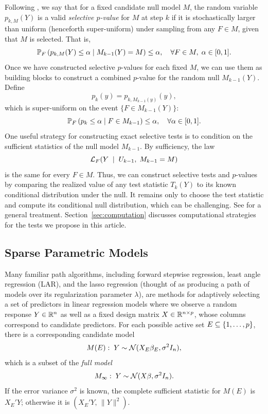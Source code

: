 \documentclass{article}
\begin{document}
Following \citet{fithian2014optimal}, we say that for a fixed candidate null model $M$, the random variable $p_{k,M}(Y)$ is a valid {\em selective $p$-value} for $M$ at step $k$ if it is stochastically larger than uniform (henceforth super-uniform) under sampling from any $F\in M$, given that $M$ is selected. That is,
\begin{equation*}
\P_F\left(p_{k,M}(Y) \leq \alpha \mid M_{k-1}(Y) = M\right) 
\leq \alpha, \quad \forall F\in M, \; \alpha \in [0,1].
\end{equation*}
Once we have constructed selective $p$-values for each fixed $M$, we can use them as building blocks to construct a combined $p$-value for the random null $M_{k-1}(Y)$. Define
\[
p_k(y) = p_{k, M_{k-1}(y)}(y),
\]
which is super-uniform on the event $\{F \in M_{k-1}(Y)\}$:
\begin{equation}\label{eq:selectiveGuaranteePk}
\P_F\left(p_k \leq \alpha \mid F\in M_{k-1}\right) \leq \alpha, \quad \forall \alpha \in [0,1].
\end{equation}
One useful strategy for constructing exact selective tests is to condition on the sufficient statistics of the null model $M_{k-1}$. By sufficiency, the law
\[
\cL_F(Y \;\mid\; U_{k-1}, \; M_{k-1}=M)
\]
is the same for every $F\in M$. Thus, we can construct selective tests and $p$-values by comparing the realized value of any test statistic $T_k(Y)$ to its known conditional distribution under the null. It remains only to choose the test statistic and compute its conditional null distribution, which can be challenging. See \citet{fithian2014optimal} for a general treatment. Section~\ref{sec:computation} discusses computational strategies for the tests we propose in this article.

\subsection{Sparse Parametric Models}\label{sec:genSparse}

Many familiar path algorithms, including forward stepwise regression, least angle regression (LAR), and the lasso regression (thought of as producing a path of models over its regularization parameter $\lambda$), are methods for adaptively selecting a set of predictors in linear regression models where we observe a random response $Y\in \R^n$ as well as a fixed design matrix $X\in \R^{n \times p}$, whose columns correspond to candidate predictors. For each possible active set $E \sub \{1,\ldots,p\}$, there is a corresponding candidate model
\[
M(E):\; Y \sim \cN( X_E\beta_E, \sigma^2 I_n),
\]
which is a subset of the {\em full model}
\[
M_\infty:\; Y \sim \cN(X\beta, \sigma^2I_n).
\]
If the error variance $\sigma^2$ is known, the complete sufficient statistic for $M(E)$ is $X_E'Y$; otherwise it is $\left(X_E'Y,\, \|Y\|^2\right)$.
\end{document}

